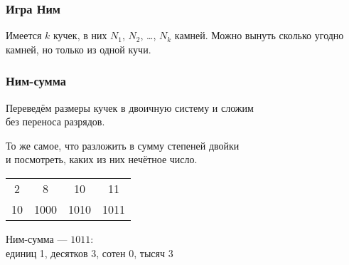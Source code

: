 \begin{frame} \frametitle{Игра Ним}
	Имеется $k$ кучек, в них $N_1$, $N_2$, \ldots, $N_k$ камней. Можно вынуть сколько угодно камней, но только из одной кучи. \medskip

\begin{center} \end{center}
\end{frame}


\begin{frame} \frametitle{Ним-сумма}
	Переведём размеры кучек в двоичную систему и сложим \\
	без переноса разрядов.

	То же самое, что разложить в сумму степеней двойки \\
	и посмотреть, каких из них нечётное число. \medskip

\begin{center}\begin{tabular}{cccc}
2 & 8 & 10 & 11 \\
{\small 10} & {\small 1000} & {\small 1010} & {\small 1011}
\end{tabular}

Ним-сумма — $1011$:\\
единиц 1, десятков 3, сотен 0, тысяч 3 \end{center}
\end{frame}

